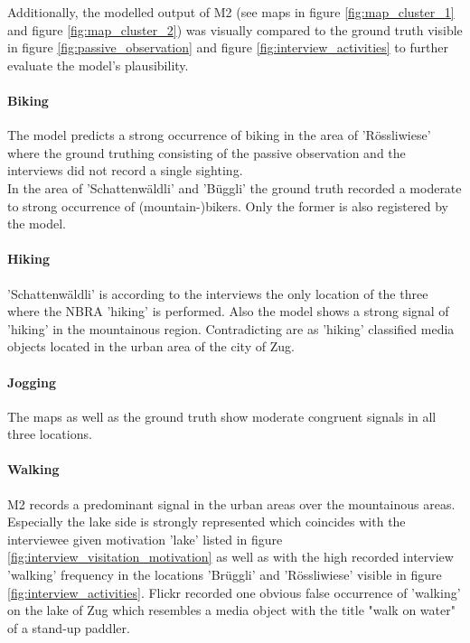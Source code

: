 Additionally, the modelled output of M2 (see maps in figure \ref{fig:map_cluster_1} and figure \ref{fig:map_cluster_2}) was visually compared to the ground truth visible in figure \ref{fig:passive_observation} and figure \ref{fig:interview_activities} to further evaluate the model's plausibility.

\paragraph*{Biking}
The model predicts a strong occurrence of biking in the area of 'R\"ossliwiese' where the ground truthing consisting of the passive observation and the interviews did not record a single sighting.\\
In the area of 'Schattenw\"aldli' and 'B\"uggli' the ground truth recorded a moderate to strong occurrence of (mountain-)bikers. Only the former is also registered by the model. 

\paragraph*{Hiking}
'Schattenw\"aldli' is according to the interviews the only location of the three where the NBRA 'hiking' is performed. Also the model shows a strong signal of 'hiking' in the mountainous region. Contradicting are as 'hiking' classified media objects located in the urban area of the city of Zug.

\paragraph*{Jogging}
The maps as well as the ground truth show moderate congruent signals in all three locations.

\paragraph*{Walking}
M2 records a predominant signal in the urban areas over the mountainous areas. Especially the lake side is strongly represented which coincides with the interviewee given motivation 'lake' listed in figure \ref{fig:interview_visitation_motivation} as well as with the high recorded interview 'walking' frequency in the locations 'Br\"uggli' and 'R\"ossliwiese' visible in figure \ref{fig:interview_activities}. Flickr recorded one obvious false occurrence of 'walking' on the lake of Zug which resembles a media object with the title "walk on water" of a stand-up paddler.


